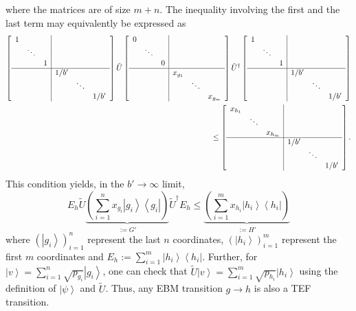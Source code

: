 \documentclass{theoretics}
\begin{document}
where the matrices are of size $m+n$. The inequality involving the
first and the last term may equivalently be expressed as 
\begin{align}
\left[\begin{array}{ccc|ccc}
1 &  & \\
 & \ddots & \\
 &  & 1\\
\hline  &  &  & 1/b'\\
 &  &  &  & \ddots\\
 &  &  &  &  & 1/b'
\end{array}\right]\tilde{U}\left[\begin{array}{ccc|ccc}
0 &  & \\
 & \ddots & \\
 &  & 0\\
\hline  &  &  & x_{g_{1}}\\
 &  &  &  & \ddots\\
 &  &  &  &  & x_{g_{m}}
\end{array}\right]\tilde{U}^{\dagger}\left[\begin{array}{ccc|ccc}
1 &  & \\
 & \ddots & \\
 &  & 1\\
\hline  &  &  & 1/b'\\
 &  &  &  & \ddots\\
 &  &  &  &  & 1/b'
\end{array}\right]\nonumber \\
\le\left[\begin{array}{ccc|ccc}
x_{h_{1}} &  & \\
 & \ddots & \\
 &  & x_{h_{m}}\\
\hline  &  &  & 1/b'\\
 &  &  &  & \ddots\\
 &  &  &  &  & 1/b'
\end{array}\right].\label{eq:noDivergence}
\end{align}
This condition yields, in the $b'\to\infty$ limit, 
\begin{equation}
E_{h}\tilde{U}\underbrace{\left(\sum_{i=1}^{n}x_{g_{i}}\left|g_{i}\right\rangle \left\langle g_{i}\right|\right)}_{:=G'}\tilde{U}^{\dagger}E_{h}\le\underbrace{\left(\sum_{i=1}^{m}x_{h_{i}}\left|h_{i}\right\rangle \left\langle h_{i}\right|\right)}_{:=H'}\label{eq:TEFcondition_noDivergence}
\end{equation}
where $(\left|g_{i}\right\rangle )_{i=1}^{n}$ represent the last
$n$ coordinates, $(\left|h_{i}\right\rangle )_{i=1}^{m}$ represent
the first $m$ coordinates and $E_{h}:=\sum_{i=1}^{m}\left|h_{i}\right\rangle \left\langle h_{i}\right|$.
Further, for $\left|v\right\rangle =\sum_{i=1}^{n}\sqrt{p_{g_{i}}}\left|g_{i}\right\rangle $,
one can check that $\tilde{U}\left|v\right\rangle =\sum_{i=1}^{m}\sqrt{p_{h_{i}}}\left|h_{i}\right\rangle $
using the definition of $\left|\psi\right\rangle $ and $\tilde{U}$.
Thus, any EBM transition $g\to h$ is also a TEF transition. 
\end{document}
